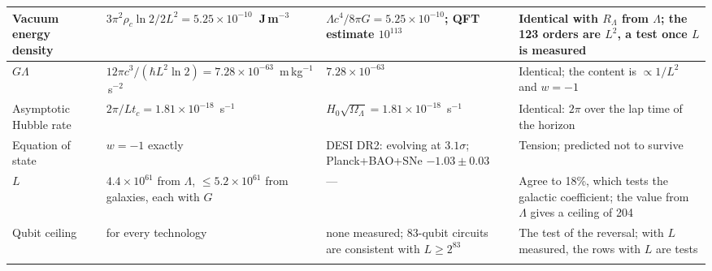 \documentclass[aps,prd,twocolumn,superscriptaddress,nofootinbib,showkeys]{revtex4-2}
\makeatletter
\newcommand{\tc}{t_c}
\newcommand{\RL}{R_\Lambda}
\def\section{\@startsection{section}{1}{\z@}{0.6cm \@plus1ex \@minus .2ex}{0.35cm}{\normalfont\small\bfseries}}
\makeatother
\begin{document}
\begin{ruledtabular}
\begin{tabular}{>{\raggedright\arraybackslash}p{2.3cm}>{\raggedright\arraybackslash}p{5.2cm}>{\raggedright\arraybackslash}p{4.3cm}>{\raggedright\arraybackslash}p{5.2cm}}
\hline
Vacuum energy density & $3\pi^2\rho_c\ln2/2L^2 = 5.25\times10^{-10}$~J\,m$^{-3}$ & $\Lambda c^4/8\pi G = 5.25\times10^{-10}$; QFT estimate $10^{113}$ & Identical with $\RL$ from $\Lambda$; the 123 orders are $L^2$, a test once $L$ is measured \\
\hline
$G\Lambda$ & $12\pi c^3/(\hbar L^2\ln2) = 7.28\times10^{-63}$~m\,kg$^{-1}$\,s$^{-2}$ & $7.28\times10^{-63}$ & Identical; the content is $\propto1/L^2$ and $w = -1$ \\
\hline
Asymptotic Hubble rate & $2\pi/L\tc = 1.81\times10^{-18}$~s$^{-1}$ & $H_0\sqrt{\Omega_\Lambda} = 1.81\times10^{-18}$~s$^{-1}$ & Identical: $2\pi$ over the lap time of the horizon \\
\hline
Equation of state & $w = -1$ exactly & DESI DR2: evolving at $3.1\sigma$; Planck+BAO+SNe $-1.03\pm0.03$ & Tension; predicted not to survive \\
\hline
$L$ & $4.4\times10^{61}$ from $\Lambda$, $\le5.2\times10^{61}$ from galaxies, each with $G$ & --- & Agree to 18\%, which tests the galactic coefficient; the value from $\Lambda$ gives a ceiling of 204 \\
\hline
Qubit ceiling & 204 for every technology & none measured; 83-qubit circuits are consistent with $L\ge2^{83}$ & The test of the reversal; with $L$ measured, the rows with $L$ are tests \\
\arrayrulecolor{black}
\end{tabular}
\end{ruledtabular}
\vspace{3pt}\par
\endgroup
\vspace{8pt}
\twocolumngrid

\section{Introduction}
\end{document}
